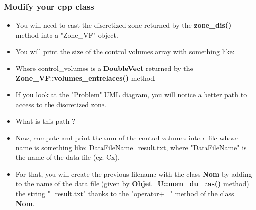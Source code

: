 \documentclass[10pt, hyperref={unicode=true,pdfusetitle, bookmarks=true,bookmarksnumbered=false,bookmarksopen=false, breaklinks=false,pdfborder={0 0 1},backref=true,colorlinks=true,linkcolor=darkblue,pageanchor, urlcolor=darkblue}]{beamer}
\begin{document}
\begin{frame}
\frametitle{Modify your cpp class}
\begin{block}{}

\begin{itemize}
\item You will need to cast the discretized zone returned by the \textbf{zone\_dis()} method into a "Zone\_VF" object.

\item You will print the size of the control volumes array with something like:
\begin{center}
\end{center}

\item Where control\_volumes is a \textbf{DoubleVect} returned by the \textbf{Zone\_VF::volumes\_entrelaces()} method.

\item If you look at the "Problem" UML diagram, you will notice a better path to access to the discretized zone.
\item What is this path ?

\item Now, compute and print the sum of the control volumes into a file whose name is something like: DataFileName\_result.txt, where "DataFileName" is the name of the data file (eg: Cx).

\item For that, you will create the previous filename with the class \textbf{Nom} by adding to the name of the data file (given by \textbf{Objet\_U::nom\_du\_cas()} method) the string "\_result.txt" thanks to the "operator+=" method of the class \textbf{Nom}.
\end{itemize}

\end{block}
\end{frame}
\end{document}
